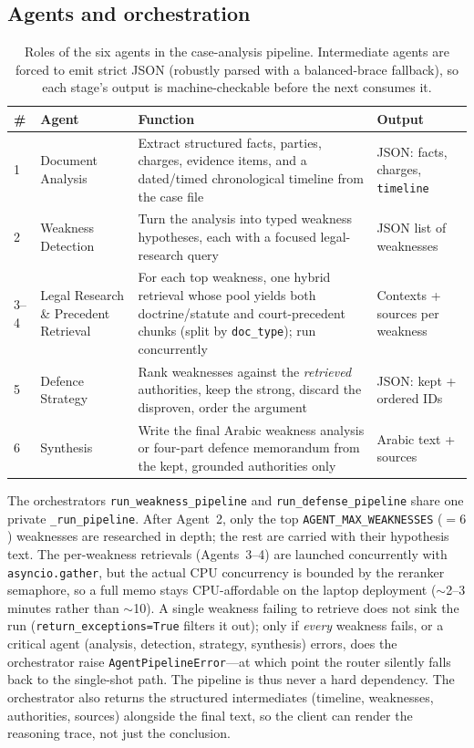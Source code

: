 \documentclass[final,1p,times]{elsarticle}
\newcommand{\thead}[1]{\textbf{#1}}                 %
\begin{document}
\subsection{Agents and orchestration}

\begin{table}[!htb]
\centering
\small
\caption{Roles of the six agents in the case-analysis pipeline. Intermediate
agents are forced to emit strict JSON (robustly parsed with a balanced-brace
fallback), so each stage's output is machine-checkable before the next consumes
it.}
\label{tab:agents}
\setlength{\tabcolsep}{5pt}
\renewcommand{\arraystretch}{1.25}
\begin{tabular}{L{1.0cm} L{3.1cm} L{6.0cm} L{3.6cm}}
\toprule
{}
\thead{\#} & \thead{Agent} & \thead{Function} & \thead{Output} \\
 & Document Analysis & Extract structured facts, parties, charges, evidence items, and a dated/timed chronological timeline from the case file & JSON: facts, charges, \texttt{timeline} \\
2 & Weakness Detection & Turn the analysis into typed weakness hypotheses, each with a focused legal-research query & JSON list of weaknesses \\
3--4 & Legal Research \& Precedent Retrieval & For each top weakness, one hybrid retrieval whose pool yields both doctrine/statute and court-precedent chunks (split by \texttt{doc\_type}); run concurrently & Contexts + sources per weakness \\
5 & Defence Strategy & Rank weaknesses against the \emph{retrieved} authorities, keep the strong, discard the disproven, order the argument & JSON: kept + ordered IDs \\
6 & Synthesis & Write the final Arabic weakness analysis or four-part defence memorandum from the kept, grounded authorities only & Arabic text + sources \\
\bottomrule
\end{tabular}
\end{table}

The orchestrators \texttt{run\_weakness\_pipeline} and
\texttt{run\_defense\_pipeline} share one private \texttt{\_run\_pipeline}. After
Agent~2, only the top \texttt{AGENT\_MAX\_WEAKNESSES} ($=6$) weaknesses are
researched in depth; the rest are carried with their hypothesis text. The
per-weakness retrievals (Agents~3--4) are launched concurrently with
\texttt{asyncio.gather}, but the actual CPU concurrency is bounded by the reranker
semaphore, so a full memo stays CPU-affordable on the laptop deployment ($\sim$2--3
minutes rather than $\sim$10). A single weakness failing to retrieve does not sink
the run (\texttt{return\_exceptions=True} filters it out); only if \emph{every}
weakness fails, or a critical agent (analysis, detection, strategy, synthesis)
errors, does the orchestrator raise \texttt{AgentPipelineError}---at which point the
router silently falls back to the single-shot path. The pipeline is thus never a
hard dependency. The orchestrator also returns the structured intermediates
(timeline, weaknesses, authorities, sources) alongside the final text, so the
client can render the reasoning trace, not just the conclusion.
\end{document}
